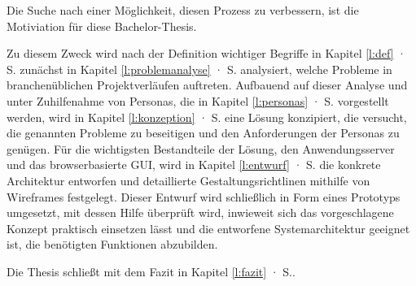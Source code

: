 \bigskip

Die Suche nach einer Möglichkeit, diesen Prozess zu verbessern, ist die Motiviation für diese Bachelor-Thesis. 

\bigskip

Zu diesem Zweck wird nach der Definition wichtiger Begriffe in Kapitel \ref{l:def} · S.\pageref{l:def} zunächst in Kapitel \ref{l:problemanalyse} · S.\pageref{l:problemanalyse} analysiert, welche Probleme in branchenüblichen Projektverläufen auftreten. Aufbauend auf dieser Analyse und unter Zuhilfenahme von Personas, die in Kapitel \ref{l:personas} · S.\pageref{l:personas} vorgestellt werden, wird in Kapitel \ref{l:konzeption} · S.\pageref{l:konzeption} eine Lösung konzipiert, die versucht, die genannten Probleme zu beseitigen und den Anforderungen der Personas zu genügen. Für die wichtigsten Bestandteile der Lösung, den Anwendungsserver und das browserbasierte GUI, wird in Kapitel \ref{l:entwurf} · S.\pageref{l:entwurf} die konkrete Architektur entworfen und detaillierte Gestaltungsrichtlinen mithilfe von Wireframes festgelegt. Dieser Entwurf wird schließlich in Form eines Prototyps umgesetzt, mit dessen Hilfe überprüft wird, inwieweit sich das vorgeschlagene Konzept praktisch einsetzen lässt und die entworfene Systemarchitektur geeignet ist, die benötigten Funktionen abzubilden.

Die Thesis schließt mit dem Fazit in Kapitel \ref{l:fazit} · S.\pageref{l:fazit}.

\pagebreak